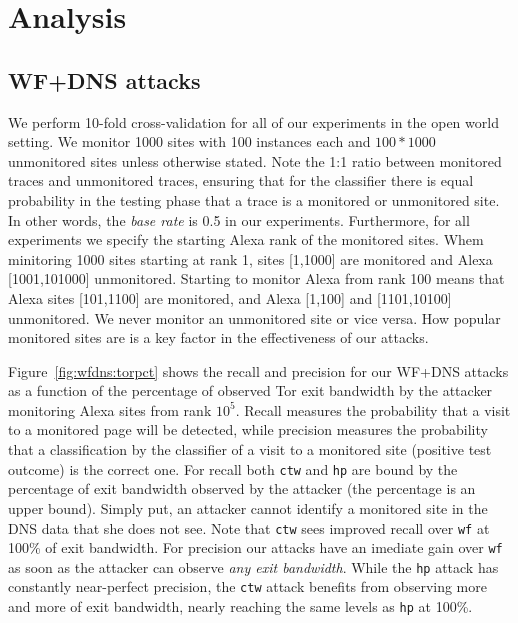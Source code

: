 \section{Analysis}
\label{sec:analysis}

\subsection{WF+DNS attacks}

We perform 10-fold cross-validation for all of our experiments in the open
world setting. We monitor 1000 sites with 100 instances each and
$100*1000$ unmonitored sites unless otherwise stated.
Note the 1:1 ratio between monitored traces and unmonitored traces,
ensuring that for the classifier there is equal probability in the testing
phase that a trace is a monitored or unmonitored site.
In other words, the \emph{base rate} is 0.5 in our experiments.
Furthermore, for all experiments we specify the starting Alexa rank of the
monitored sites. Whem minitoring 1000 sites starting at rank 1, sites
[1,1000] are monitored and Alexa [1001,101000] unmonitored. Starting to monitor
Alexa from rank 100 means that Alexa sites [101,1100] are monitored, and Alexa
 [1,100] and [1101,10100] unmonitored.
We never monitor an unmonitored site or vice versa. How popular monitored sites
are is a key factor in the effectiveness of our attacks.

Figure~\ref{fig:wfdns:torpct} shows the recall and precision for our WF+DNS
attacks as a function of the percentage of observed Tor exit bandwidth by the
attacker monitoring Alexa sites from rank $10^5$.
Recall measures the probability that a visit to a monitored page will
be detected, while precision measures the probability that a classification by
the classifier of a visit to a monitored site (positive test outcome) is the
correct one. %
For recall both \texttt{ctw} and \texttt{hp} are bound by the
percentage of exit bandwidth observed by the attacker (the percentage is an
upper bound).
Simply put, an attacker cannot identify a monitored site in the DNS data that
she does not see. Note that \texttt{ctw} sees improved recall over \texttt{wf}
at 100\% of exit bandwidth.
For precision our attacks have an imediate gain over \texttt{wf} as soon as
the attacker can observe \emph{any exit bandwidth}.
While the \texttt{hp} attack has constantly near-perfect precision, the
\texttt{ctw} attack benefits from observing more and more of exit bandwidth,
nearly reaching the same levels as \texttt{hp} at 100\%.


